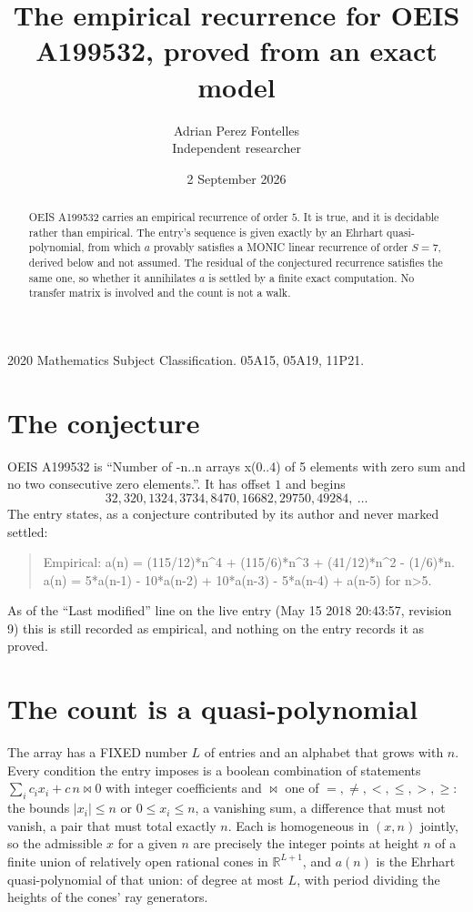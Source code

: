 \documentclass[11pt,a4paper]{article}
\title{The empirical recurrence for OEIS A199532, proved from an exact model}
\author{Adrian Perez Fontelles\\ \small Independent researcher}
\date{2 September 2026}
\theoremstyle{plain}
\theoremstyle{definition}
\begin{document}
\maketitle

\begin{abstract}
OEIS A199532 carries an empirical recurrence of order $5$. It is true, and it is
decidable rather than empirical. The entry's sequence is given exactly by an Ehrhart quasi-polynomial, from
which $a$ provably satisfies a MONIC linear recurrence of order $S=7$, derived below and not
assumed. The residual of the conjectured recurrence satisfies the same one, so whether it
annihilates $a$ is settled by a finite exact computation. No transfer matrix is involved and
the count is not a walk.
\end{abstract}

\noindent\small 2020 Mathematics Subject Classification. 05A15, 05A19, 11P21.\normalsize

\section{The conjecture}

OEIS A199532 is ``Number of -n..n arrays x(0..4) of 5 elements with zero sum and no two consecutive zero elements.''. It has offset $1$ and begins
\[
32, 320, 1324, 3734, 8470, 16682, 29750, 49284,\ \dots
\]
The entry states, as a conjecture contributed by its author and never marked settled:
\begin{quote}
Empirical: a(n) = (115/12)*n\^{}4 + (115/6)*n\^{}3 + (41/12)*n\^{}2 - (1/6)*n. a(n) = 5*a(n-1) - 10*a(n-2) + 10*a(n-3) - 5*a(n-4) + a(n-5) for n>5.
\end{quote}
As of the ``Last modified'' line on the live entry (May 15 2018 20:43:57, revision 9)
this is still recorded as empirical, and nothing on the entry records it as proved.

\section{The count is a quasi-polynomial}

The array has a FIXED number $L$ of entries and an alphabet that grows with $n$. Every
condition the entry imposes is a boolean combination of statements
$\sum_i c_ix_i + c\,n \bowtie 0$ with integer coefficients and $\bowtie$ one of
$=,\ne,<,\le,>,\ge$: the bounds $|x_i|\le n$ or $0\le x_i\le n$, a vanishing sum, a difference
that must not vanish, a pair that must total exactly $n$. Each is homogeneous in $(x,n)$
jointly, so the admissible $x$ for a given $n$ are precisely the integer points at height $n$
of a finite union of relatively open rational cones in $\mathbb{R}^{L+1}$, and $a(n)$ is
the Ehrhart quasi-polynomial of that union: of degree at most $L$, with period dividing the
heights of the cones' ray generators.
\end{document}
